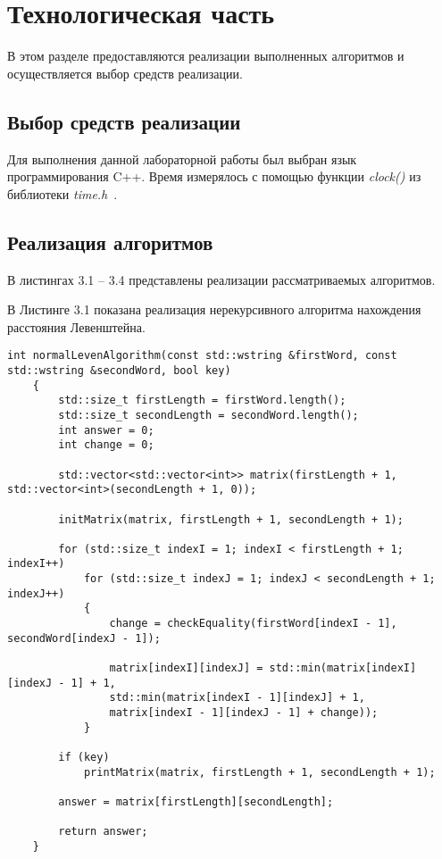 \chapter{Технологическая часть}

В этом разделе предоставляются реализации выполненных алгоритмов и осуществляется выбор средств реализации.

\section{Выбор средств реализации}

Для выполнения данной лабораторной работы был выбран язык программирования C++.  
Время измерялось с помощью функции \textit{clock()} из библиотеки \textit{time.h}~\cite{time}.

\section{Реализация алгоритмов}

В листингах 3.1 -- 3.4 представлены реализации рассматриваемых алгоритмов.


\hspace{0.6cm}В Листинге 3.1 показана реализация нерекурсивного алгоритма нахождения расстояния Левенштейна.

\bigskip

\begin{lstlisting}[caption=Нерекурсивный алгоритм поиска расстояния Левенштейна]
	int normalLevenAlgorithm(const std::wstring &firstWord, const std::wstring &secondWord, bool key)
	{
		std::size_t firstLength = firstWord.length(); 
		std::size_t secondLength = secondWord.length(); 
		int answer = 0; 
		int change = 0; 
		
		std::vector<std::vector<int>> matrix(firstLength + 1, std::vector<int>(secondLength + 1, 0));
		
		initMatrix(matrix, firstLength + 1, secondLength + 1);
		
		for (std::size_t indexI = 1; indexI < firstLength + 1; indexI++)
			for (std::size_t indexJ = 1; indexJ < secondLength + 1; indexJ++)
			{
				change = checkEquality(firstWord[indexI - 1], secondWord[indexJ - 1]);
			
				matrix[indexI][indexJ] = std::min(matrix[indexI][indexJ - 1] + 1,
				std::min(matrix[indexI - 1][indexJ] + 1,
				matrix[indexI - 1][indexJ - 1] + change));
			}
		
		if (key)
			printMatrix(matrix, firstLength + 1, secondLength + 1);
		
		answer = matrix[firstLength][secondLength];     
		
		return answer;
	}
\end{lstlisting}


